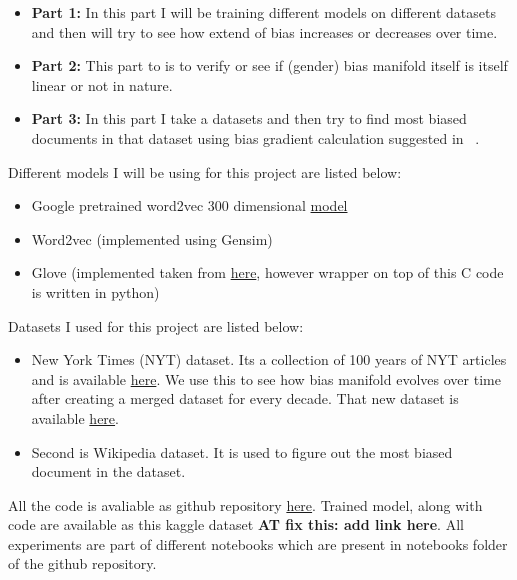 \documentclass{article}
\def\at#1{{\color{red}\textbf{AT fix this: #1}}\xspace}
\begin{document}
\begin{itemize}
    \item \textbf{Part 1:} In this part I will be training different models on different datasets and then will try to see how extend of bias increases or decreases over time.
    \item \textbf{Part 2:} This part to is to verify or see if (gender) bias manifold itself is itself linear or not in nature.
    \item \textbf{Part 3:} In this part I take a datasets and then try to find most biased documents in that dataset using bias gradient calculation suggested in ~\cite{brunet_understanding_2019}.

\end{itemize}

Different models I will be using for this project are listed below:

\begin{itemize}
    \item Google pretrained word2vec 300 dimensional \href{
https://www.kaggle.com/datasets/leadbest/googlenewsvectorsnegative300}{model}
    \item Word2vec (implemented using Gensim)
    \item Glove (implemented taken from \href{https://github.com/stanfordnlp/GloVe}{here}, however wrapper on top of this C code is written in python)
\end{itemize}

Datasets I used for this project are listed below:
\begin{itemize}
    \item New York Times (NYT) dataset. Its a collection of 100 years of NYT articles and is available \href{https://www.kaggle.com/datasets/tumanovalexander/nyt-articles-data}{here}. We use this to see how bias manifold evolves over time after creating a merged dataset for every decade. That new dataset is available \href{https://www.kaggle.com/datasets/alphadraco/i535-new-dataset}{here}.
    \item Second is Wikipedia dataset. It is used to figure out the most biased document in the dataset.
\end{itemize}
All the code is avaliable as github repository \href{https://github.com/thunderock/bias_manifold}{here}. Trained model, along with code are available as this kaggle dataset \at{add link here}. All experiments are part of different notebooks which are present in notebooks folder of the github repository.
\end{document}
